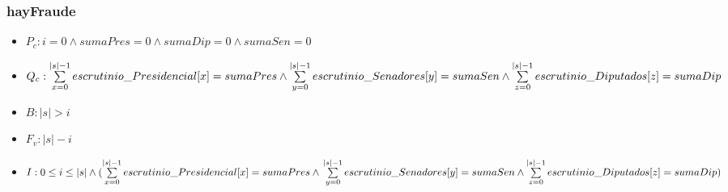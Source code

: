 \documentclass[10pt,a4paper]{article}
\begin{document}
\subsubsection{hayFraude}
\begin{itemize}

        \item $P_c : i=0 \land sumaPres=0 \land sumaDip=0 \land sumaSen=0$
	\item $Q_c : \sum\limits_{x=0}^{|s| - 1} escrutinio\_Presidencial[x] = sumaPres \land \sum\limits_{y=0}^{|s| - 1} escrutinio\_Senadores[y] = sumaSen \\ \land \sum\limits_{z=0}^{|s| - 1} escrutinio\_Diputados[z] = sumaDip$
	\item $B : |s| > i$
	\item $F_v : |s| - i$
	\item $I : 0 \leq i \leq |s| \land (\sum\limits_{x=0}^{|s| - 1} escrutinio\_Presidencial[x] = sumaPres \land \\ \sum\limits_{y=0}^{|s| - 1} escrutinio\_Senadores[y] = sumaSen \land \sum\limits_{z=0}^{|s| - 1} escrutinio\_Diputados[z] = sumaDip)$
\end{itemize}
\vspace{6mm} 
\end{document}
